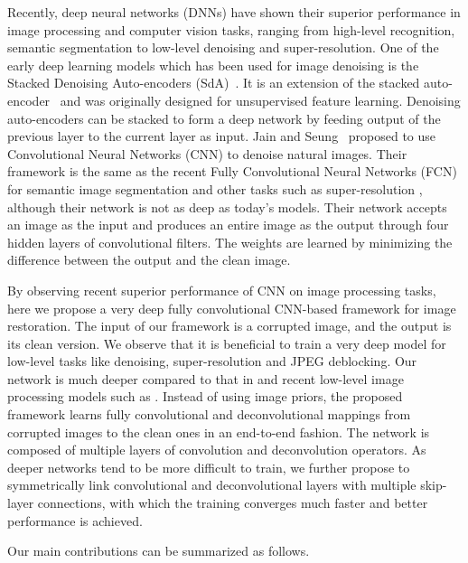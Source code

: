 \documentclass[10pt,journal,compsoc]{IEEEtran}
\begin{document}
    Recently, deep neural networks (DNNs) have shown their superior performance in image processing
and computer vision tasks, ranging from high-level recognition, semantic segmentation to low-level
denoising and super-resolution. One of the early deep learning models which has been used for image
denoising is the Stacked Denoising Auto-encoders (SdA)~\cite{DBLP:conf/icml/VincentLBM08}. It is
an extension of the stacked auto-encoder~\cite{DBLP:conf/nips/BengioLPL06} and was originally designed
for unsupervised feature learning.  Denoising auto-encoders can be stacked to form a deep network
by feeding output of the previous layer to the current layer as input. Jain and Seung~\cite{DBLP:conf/nips/JainS08}
proposed to use Convolutional Neural Networks (CNN) to denoise natural images. Their framework is
the same as the recent Fully Convolutional Neural Networks (FCN) for semantic image segmentation \cite{DBLP:conf/cvpr/LongSD15}
and other tasks such as super-resolution \cite{DBLP:journals/pami/DongLHT16}, although their network
is not as deep as today's models. Their network accepts an image as the input and produces an
entire image as the output through four hidden layers of convolutional filters.
The weights are learned by
minimizing the difference between the output and the clean image.



By observing recent superior performance of CNN on image processing tasks, here we propose a very deep fully convolutional
CNN-based framework for image restoration. The input of our framework is a corrupted image, and
the output is its clean version.  We observe that it is beneficial to train a very deep model for
low-level tasks like denoising, super-resolution and JPEG deblocking. Our network is much
deeper compared to that in \cite{DBLP:conf/nips/JainS08} and recent low-level image processing models
such as \cite{DBLP:journals/pami/DongLHT16}.  Instead of using image priors, the proposed framework
learns  fully convolutional and deconvolutional mappings from corrupted images to the clean
ones in an end-to-end fashion. The network is composed of multiple layers of convolution and deconvolution operators.
As deeper networks tend to be more difficult to train, we further propose to symmetrically link convolutional
and deconvolutional layers with multiple skip-layer connections, with which the training converges much faster
and better performance is achieved.






Our main contributions can be summarized as follows.
\end{document}
